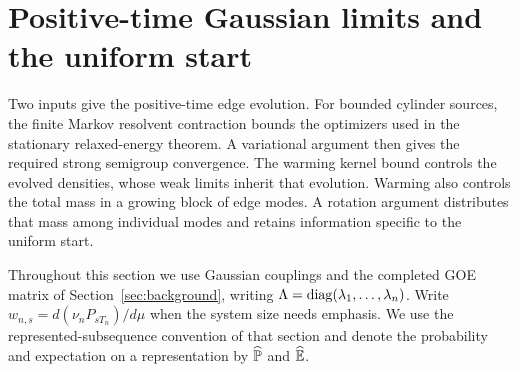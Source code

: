\section{Positive-time Gaussian limits and the uniform start}
\label{sec:gaussian-limits}

Two inputs give the positive-time edge evolution.  For bounded cylinder
sources, the finite Markov resolvent contraction bounds the optimizers
used in the stationary relaxed-energy theorem.  A variational argument
then gives the required strong semigroup convergence.  The warming
kernel bound controls the evolved densities, whose weak limits inherit
that evolution.  Warming also controls the total mass in a growing
block of edge modes.  A rotation argument distributes that mass among
individual modes and retains information specific to the uniform start.

Throughout this section we use Gaussian couplings and the completed
GOE matrix of Section~\ref{sec:background}, writing
\(\Lambda=\operatorname{diag}(\lambda_1,\ldots,\lambda_n)\).  Write
\(w_{n,s}=d(\nu_nP_{sT_n})/d\mu\) when the system size needs emphasis.
We use the represented-subsequence convention of that section and
denote the probability and expectation on a representation by
\(\widehat{\mathbb P}\) and \(\widehat{\mathbb E}\).


